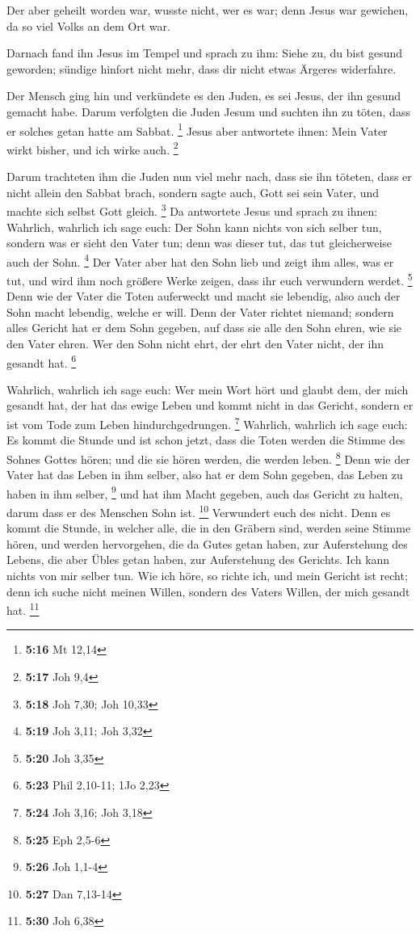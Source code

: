  Der aber geheilt worden war, wusste nicht, wer es war;
denn Jesus war gewichen, da so viel Volks an dem Ort war.

 Darnach fand ihn Jesus im Tempel und sprach zu ihm:
Siehe zu, du bist gesund geworden; sündige hinfort nicht mehr, dass dir
nicht etwas Ärgeres widerfahre.

 Der Mensch ging hin und verkündete es den Juden, es sei
Jesus, der ihn gesund gemacht habe.  Darum verfolgten die
Juden Jesum und suchten ihn zu töten, dass er solches getan hatte am
Sabbat. \footnote{\textbf{5:16} Mt 12,14}  Jesus aber
antwortete ihnen: Mein Vater wirkt bisher, und ich wirke auch.
\footnote{\textbf{5:17} Joh 9,4}

 Darum trachteten ihm die Juden nun viel mehr nach, dass
sie ihn töteten, dass er nicht allein den Sabbat brach, sondern sagte
auch, Gott sei sein Vater, und machte sich selbst Gott gleich.
\footnote{\textbf{5:18} Joh 7,30; Joh 10,33}  Da
antwortete Jesus und sprach zu ihnen: Wahrlich, wahrlich ich sage euch:
Der Sohn kann nichts von sich selber tun, sondern was er sieht den Vater
tun; denn was dieser tut, das tut gleicherweise auch der Sohn.
\footnote{\textbf{5:19} Joh 3,11; Joh 3,32}  Der Vater
aber hat den Sohn lieb und zeigt ihm alles, was er tut, und wird ihm
noch größere Werke zeigen, dass ihr euch verwundern werdet. \footnote{\textbf{5:20}
  Joh 3,35}  Denn wie der Vater die Toten auferweckt und
macht sie lebendig, also auch der Sohn macht lebendig, welche er will.
 Denn der Vater richtet niemand; sondern alles Gericht
hat er dem Sohn gegeben,  auf dass sie alle den Sohn
ehren, wie sie den Vater ehren. Wer den Sohn nicht ehrt, der ehrt den
Vater nicht, der ihn gesandt hat. \footnote{\textbf{5:23} Phil 2,10-11;
  1Jo 2,23}

 Wahrlich, wahrlich ich sage euch: Wer mein Wort hört und
glaubt dem, der mich gesandt hat, der hat das ewige Leben und kommt
nicht in das Gericht, sondern er ist vom Tode zum Leben
hindurchgedrungen. \footnote{\textbf{5:24} Joh 3,16; Joh 3,18}
 Wahrlich, wahrlich ich sage euch: Es kommt die Stunde
und ist schon jetzt, dass die Toten werden die Stimme des Sohnes Gottes
hören; und die sie hören werden, die werden leben. \footnote{\textbf{5:25}
  Eph 2,5-6}  Denn wie der Vater hat das Leben in ihm
selber, also hat er dem Sohn gegeben, das Leben zu haben in ihm selber,
\footnote{\textbf{5:26} Joh 1,1-4}  und hat ihm Macht
gegeben, auch das Gericht zu halten, darum dass er des Menschen Sohn
ist. \footnote{\textbf{5:27} Dan 7,13-14}  Verwundert
euch des nicht. Denn es kommt die Stunde, in welcher alle, die in den
Gräbern sind, werden seine Stimme hören,  und werden
hervorgehen, die da Gutes getan haben, zur Auferstehung des Lebens, die
aber Übles getan haben, zur Auferstehung des Gerichts. 
Ich kann nichts von mir selber tun. Wie ich höre, so richte ich, und
mein Gericht ist recht; denn ich suche nicht meinen Willen, sondern des
Vaters Willen, der mich gesandt hat. \footnote{\textbf{5:30} Joh 6,38}

